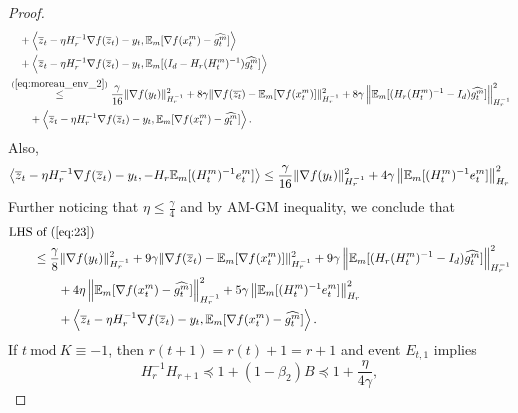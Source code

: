 \documentclass{article} %
\numberwithin{equation}{section}
\renewcommand{\eqref}[1]{(\ref{#1})}
\begin{document}
\begin{proof}
\begin{equation}
\begin{aligned}
            &\quad+ \left\langle \overline{z}_{t}-\eta H_r^{-1}\nabla f(\overline{z}_t)-y_t, \expect_m[\nabla f(x_t^m)-\widehat{g_t^m}]\right\rangle \\
            &\quad+ \left\langle \overline{z}_{t}-\eta H_r^{-1}\nabla f(\overline{z}_t)-y_t, \expect_m[(I_d-H_r(H_t^m)^{-1})\widehat{g_t^m}]\right\rangle \\
            &\overset{\eqref{eq:moreau_env_2}}{\leq} \frac{\gamma}{16}\|\nabla f(y_t)\|_{H_r^{-1}}^2 + 8\gamma \|\nabla f(\overline{z_t})-\expect_m[\nabla f(x_t^m)]\|_{H_r^{-1}}^2 + 8\gamma \left\|\expect_m[(H_r(H_t^m)^{-1}-I_d)\widehat{g_t^m}]\right\|_{H_r^{-1}}^2 \\
            &\qquad+ \left\langle \overline{z}_{t}-\eta H_r^{-1}\nabla f(\overline{z}_t)-y_t, \expect_m[\nabla f(x_t^m)-\widehat{g_t^m}]\right\rangle.
        \end{aligned}
    \end{equation}
    Also,
    \begin{equation}
        \left\langle \overline{z}_{t}-\eta H_r^{-1}\nabla f(\overline{z}_t)-y_t, -H_r\mathbb{E}_m[(H_t^m)^{-1}e_t^m]\right\rangle 
        \leq \frac{\gamma}{16}\|\nabla f(y_t)\|_{H_r^{-1}}^2 + 4\gamma \left\| \mathbb{E}_m[(H_t^m)^{-1}e_t^m] \right\|_{H_r}^2
    \end{equation}
    Further noticing that $\eta\leq \frac{\gamma}{4}$ and by AM-GM inequality, we conclude that 
    \begin{equation}\label{eq:6}
        \begin{aligned}
            & \text{LHS of \eqref{eq:23}} \\
            &\qquad \leq \frac{\gamma}{8}\|\nabla f(y_t)\|_{H_r^{-1}}^2 + 9\gamma \|\nabla f(\overline{z}_t)-\expect_m[\nabla f(x_t^m)]\|_{H_r^{-1}}^2 + 9\gamma \left\|\expect_m [(H_r(H_t^m)^{-1}-I_d)\widehat{g_t^m}]\right\|_{H_r^{-1}}^2 \\
            &\qquad\qquad + 4\eta \left\| \expect_m[\nabla f(x_t^m)-\widehat{g_t^m}]\right\|_{H_r^{-1}}^2 + 5\gamma \left\| \expect_m[(H_t^m)^{-1}e_t^m] \right\|_{H_r}^2\\
            &\qquad\qquad + \left\langle \overline{z}_{t}-\eta H_r^{-1}\nabla f(\overline{z}_t)-y_t, \expect_m[\nabla f(x_t^m)-\widehat{g_t^m}]\right\rangle.
        \end{aligned}
    \end{equation}
    If $t\ \text{mod}\ K \equiv -1$, then $r(t+1)=r(t)+1=r+1$ and event $E_{t,1}$ implies
    \begin{equation}
        H_r^{-1}H_{r+1} \preceq 1 + (1-\beta_2)B \preceq 1 + \frac{\eta}{4\gamma},

\end{equation}
\end{proof}
\end{document}
